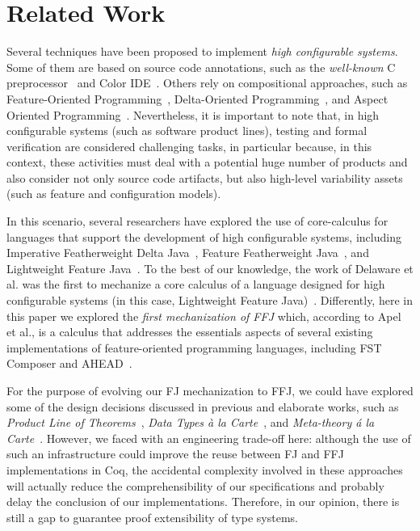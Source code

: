 \chapter{Related Work}\label{chap:related}

Several techniques have been proposed to implement
\emph{high configurable systems}. Some of
them are based on source code annotations, such as
the \emph{well-known} C preprocessor~\cite{stallman:cpp} and Color IDE~\cite{kastner:icse2008}. Others
rely on compositional approaches, such as
Feature-Oriented Programming~\cite{batory-tse2004,batory_feature-oriented_2004},
Delta-Oriented Programming~\cite{schaefer_delta-oriented_2010}, 
and Aspect Oriented Programming~\cite{kiczales:ecoop2001,alves:splc2005}.
Nevertheless, it is important to
note that, in high configurable systems (such as software
product lines), testing and formal verification are considered
challenging tasks, in particular because, in this context,
these activities must deal with a potential huge number of
products and also consider not only source code artifacts,
but also high-level variability assets (such as feature and
configuration models).

In this scenario, several researchers have explored
the use of core-calculus for languages that
support the development of high configurable systems,
including Imperative Featherweight Delta Java~\cite{schaefer:aosd2011}, Feature
Featherweight Java~\cite{apel_feature_2008}, and Lightweight Feature Java~\cite{delaware:fse-2009}.
To the best of our knowledge, the work of Delaware
et al. was the first to mechanize a core calculus
of a language designed for high configurable systems (in
this case, Lightweight Feature Java)~\cite{delaware:fse-2009}. Differently, here in
this paper we explored the \emph{first mechanization of \gls{FFJ}}
which, according to Apel et al., is a calculus that
addresses the essentials aspects of several
existing implementations of feature-oriented programming
languages, including FST Composer and AHEAD~\cite{apel_feature_2008}. 

For the purpose of evolving our \gls{FJ} mechanization
to \gls{FFJ}, we could have explored some of the
design decisions discussed in previous and elaborate works, such as
\emph{Product Line of Theorems}~\cite{delaware:oopsla2011},
\emph{Data Types \`{a} la Carte}~\cite{swierstra_2008},
and \emph{Meta-theory \'{a} la Carte}~\cite{delaware:popl2013}.
However, we faced with
an engineering trade-off here: although the use of such an
infrastructure could improve the reuse between \gls{FJ} and \gls{FFJ}
implementations in Coq, the accidental complexity involved in
these approaches will actually reduce the comprehensibility of our
specifications and probably delay the conclusion of our
implementations. Therefore, in our opinion, there is still a
gap to guarantee proof extensibility of type systems. 
